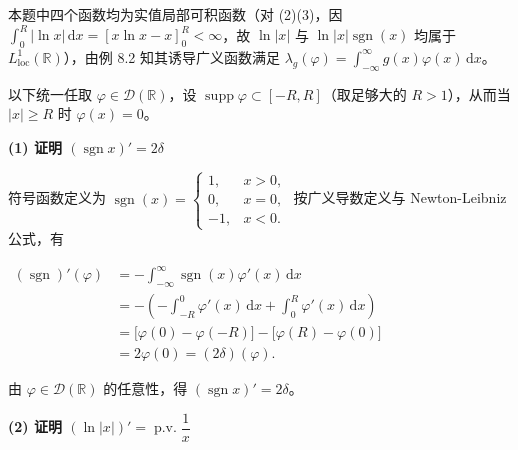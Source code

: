\documentclass[11pt,a4paper]{article}
\newcommand{\SoftDivider}{%
  \par\vspace{5pt}\noindent\makebox[\linewidth][c]{\textcolor{BorderColor}{\rule{0.38\linewidth}{0.6pt}}}\par\vspace{5pt}%
}
\newcommand{\SubPillMain}[1]{%
  \Needspace{4.5\baselineskip}\vspace{5.5pt}\noindent
  \tcbox[on line, colback=AccentMain, colframe=AccentMain, boxrule=0pt,
    arc=3.5pt, left=6pt, right=6pt, top=2pt, bottom=2pt]{\small\bfseries\color{white}#1}%
  \par\nopagebreak[4]\vspace{3pt}%
}
\newcommand{\FitDisplayMath}[1]{%
  \par\vspace{4pt}\noindent
  \begin{adjustbox}{max width=\linewidth, center}
    $\displaystyle #1$
  \end{adjustbox}
  \par\vspace{4pt}%
}
\begin{document}
\SubPillMain{【规范解答】}

本题中四个函数均为实值局部可积函数（对 (2)(3)，因 \(\int_0^R |\ln x|\,\mathrm{d}x = [x\ln x - x]_0^R < \infty\)，故 \(\ln|x|\) 与 \(\ln|x|\operatorname{sgn}(x)\) 均属于 \(L^1_{\mathrm{loc}}(\mathbb{R})\)），由例 8.2 知其诱导广义函数满足 \(\lambda_g(\varphi) = \int_{-\infty}^{\infty} g(x)\varphi(x)\,\mathrm{d}x\)。

以下统一任取 \(\varphi \in \mathcal{D}(\mathbb{R})\)，设 \(\operatorname{supp}\varphi \subset [-R, R]\)（取足够大的 \(R > 1\)），从而当 \(|x| \ge R\) 时 \(\varphi(x) = 0\)。

\SoftDivider

\textbf{(1) 证明 \((\operatorname{sgn} x)' = 2\delta\)}

符号函数定义为 \(\operatorname{sgn}(x) = \begin{cases} 1, & x > 0, \\ 0, & x = 0, \\ -1, & x < 0. \end{cases}\) 按广义导数定义与 Newton-Leibniz 公式，有 
\FitDisplayMath{\begin{aligned}
(\operatorname{sgn})'(\varphi) &= -\int_{-\infty}^{\infty}\operatorname{sgn}(x)\varphi'(x)\,\mathrm{d}x \\
&= -\left(-\int_{-R}^{0}\varphi'(x)\,\mathrm{d}x + \int_{0}^{R}\varphi'(x)\,\mathrm{d}x\right) \\
&= \big[\varphi(0) - \varphi(-R)\big] - \big[\varphi(R) - \varphi(0)\big] \\
&= 2\varphi(0) = (2\delta)(\varphi).
\end{aligned}}
 由 \(\varphi \in \mathcal{D}(\mathbb{R})\) 的任意性，得 \((\operatorname{sgn} x)' = 2\delta\)。

\SoftDivider

\textbf{(2) 证明 \((\ln|x|)' = \operatorname{p.v.}\dfrac{1}{x}\)}
\end{document}
